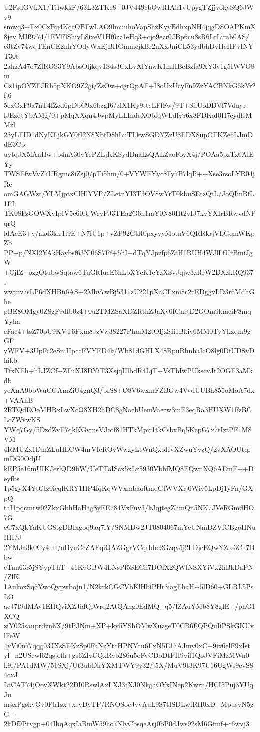U2FsdGVkX1/TiIwkkF/63L3ZTKe8+0JV449cbOwRIAh1vUpygTZjjvokySQ6JWv9
smwq3+Ex0CzBjj4KqrOBFwLAO9lmuuhoVapShzKyyBdhxpNH4jqgDSOAPKmX8jev
MIf9774/1EVFlShiyL8ixeV1Hf6zz1eHq3+cjo9ezr0JBp6cu8sR6LrLirab0AS/
c3tZv74wqTEnCE2nhYOdyWxEjBHGmmejkBr2nXxJniCL53ydbhDvHeHPvINYT30t
2ahzA47o7ZfROS3Y9AbsOljkqv1S4s3CxLvXlYnwK1mHBcBzfa9XY3v1g5IWVO8m
Cz1ipOYZFJRh5pXKO9Z2gi/ZsOw+cgrQpAF+I8oUxUcyFn9ZzYACBNkG6kYr2fj6
5exGxF9a7nT4fZcd6pDbC9x6bzgI6/zlX1Ky9tteLFfFw/9T+SifUoDDVl7Vdnyr
lJEzqtYbAMg/0+pMqXXqn4JwpMyLLIndeXObfqWLdfy96x8FDKoI0H7eydlsMMzl
23yLFID1dNyKFjkGY0fI2N8XbfD8hLuTLkwSGDYZzU8FDX8upCTKZe6LJmDdE3Cb
uytqJX5lAnHw+b4nA30yYrPZLjKKSydBnaLsQALZaoFoyX4j/POAa5pzTx0AlEYy
TWSEfwVvZ7URgmc8iZsj0/pTi5hm/0+VYWFYyc8Fy7B7lqP++Xse3rsoLYR04jRe
omGAGWzt/YLMjptxClHlYVP/ZLetnYI3T3OV8wYrT0kbuSEtzQtL/JoQImBfL1FI
TK08FzGOWXvIpIV5e60lUWryPJ3TEa2G6n1mY0N80Ht2yIJ7kvYXIrBRwvdNPqrQ
ldAcE3+y/akd3klr1f9E+N7fU1p+vZP92GtR0pxyyyMotnV6QRRkrjVLGqmWKpZb
PP+p/NXl2YAkHaybsf63Nl06S7Ff+5hI+dTqYJpzfp6ZtH1RUH4WJlLfUrBmiJgW
+CjIZ+ozgOtubwSqtaw6TuGftfucE6hLbXYcK1eYzXSvJqjw3zRrW2DXzkRQ937s
wwjnv7sLP6dXHBn6AS+2Mbv7wBj5311zU221pXaCFxni8c2cEDggvLD3r6MdhGhe
pBE8OMgy0Z8gF9dfb0z4+0u2TMZSaXDZRthZJaXv0fGnrtD2GOm9kmciP8mqYyha
eFac4+tsZ70pU9KVT6Fxm8JzVw38227PhmM2tOIjzSIi1Bkiv6MM0TyYkxqm9gGF
yWFV+3UpFc2eSmIIpccFVYED4k/Wb81dGHLX48BpuRhnhaIcO8lg0DfUDSyDhikb
TfxNEh+hLJZCf+ZFuXJ8DYiT3XsjqIIlbdR4LjT+VsTbIwPUkscvJt2OGE3aMkdb
yeXnA9bbWuCGAmZiU4gnQ3/brS8+O8V6wxmFZBGw4VvdUUBh855oMoA7dx+VAAhB
2RTQdEOoMHRxLwXcQ8XH2hDC8gNoebUemVaezw3mE3eqRa3HUXW1FzBCLcZWvwKS
YWq7Gy/5DzdZvE7qkKGvmsVJotf81HTkMpir1tkCsbxBq5KepG7x7tIztPF1M8VM
4RMUZx1DmZLuHLCW4nrVIeROyWwzyLtWnQxoHvXZwuYyzQ/2vXAOUtqlmDG0OdjU
kEP5e16mUIKJerlQD9bW/UeTToIScx5xLz5930VbbfMQ8EQwnXQ6AEmF++Deyfbs
1p5gyX4YtCIz0ieqlKRY1HP4fqKqWVxmbaoftmqGfWVXrj0Wiy5LpDj1yFn/GXpQ
taI1pqcmrw02ZkxGbhHaHag8yEE784VxFuy3/kJqjtegZhmQn5NK7JVeRGmdHO7G
eC7xQkYaKUG8tgDBIxgoq9aq7iY/SNMDw2JT0804067mYcUNmDZVfCBgoHNuHH/J
2YMJa3k0Cy4mI/aHynCcZAEqiQAZGgrVCqsbbc2Gzqy5j2LDjeEQwYZts3Cn7Bbw
eTnn63r5jSYypThT+41KvGBW4LNsPf5SECii7DOfX2QWfNSXYiVx2hBkDaPN/ZlK
1AukoxSq6YwoQypwbojn1/N2krkCGCVbKlHbiPHr3iagEhaH+5lD60+GLRL5PsLO
acJ7I9dMAv1EHQviXZJidQlWrq2AtQAng0EdMQ+q5/lZAuYMb8Y8gIE+/phG1XCQ
ziY025sauprdznhX/9tPJNm+XP+ky5YShOMwXuzgeT0CB6FQPQuIiPSkGKUvlFeW
4yVi0n77qqg03JXsSEKzSp0FaNzYtcHPNYtu6FxN5E17AJmy0xC+9ix6elF9xIst
yl+n2UScwl62qsjofh+gs6ZIvCQxRvb286u5oFvCDoDtPII9vif1QoJVFiMzMWn0
k9f/PA1dMW/51SXj/Ut3ubDhYXMTWY9y32/j5X/MuV9t3K97U16UgWs9cvS84cxJ
LtCAT74jOovXWkt22DI0RswlAxLXJ3tXJ0NkgaOYxINep2Kwrn/HCI5Puj3YUqJu
nrsxPgskvGv0Ph1sx+xsvDyTP/RNOSoeJvvAuL9S7tISDLwfRH0xD+MpusvN5gG+
2kDf9Ptvgp+04IbqAqxIaBmW59ho7NlvCbsqeArj0bP0dJws92sM6Gfmf+c6wvj3
